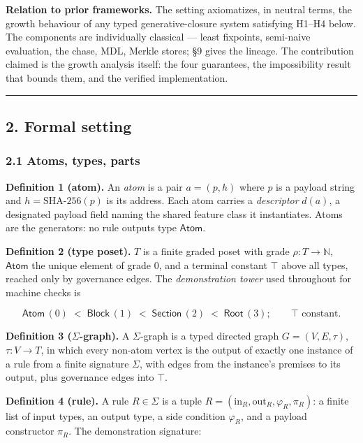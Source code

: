 \documentclass[
  10pt,
]{article}
\begin{document}
\textbf{Relation to prior frameworks.} The setting axiomatizes, in
neutral terms, the growth behaviour of any typed generative-closure
system satisfying H1--H4 below. The components are individually
classical --- least fixpoints, semi-naive evaluation, the chase, MDL,
Merkle stores; §9 gives the lineage. The contribution claimed is the
growth analysis itself: the four guarantees, the impossibility result
that bounds them, and the verified implementation.

\begin{center}\rule{0.5\linewidth}{0.5pt}\end{center}

\hypertarget{formal-setting}{%
\subsection{2. Formal setting}\label{formal-setting}}

\hypertarget{atoms-types-parts}{%
\subsubsection{2.1 Atoms, types, parts}\label{atoms-types-parts}}

\textbf{Definition 1 (atom).} An \emph{atom} is a pair \(a = (p, h)\)
where \(p\) is a payload string and \(h = \mathrm{SHA\text{-}256}(p)\)
is its address. Each atom carries a \emph{descriptor} \(d(a)\), a
designated payload field naming the shared feature class it
instantiates. Atoms are the generators: no rule outputs type
\(\mathsf{Atom}\).

\textbf{Definition 2 (type poset).} \(T\) is a finite graded poset with
grade \(\rho : T \to \mathbb{N}\), \(\mathsf{Atom}\) the unique element
of grade \(0\), and a terminal constant \(\top\) above all types,
reached only by governance edges. The \emph{demonstration tower} used
throughout for machine checks is

\[\mathsf{Atom}\,(0) \;<\; \mathsf{Block}\,(1) \;<\; \mathsf{Section}\,(2) \;<\; \mathsf{Root}\,(3); \qquad \top \text{ constant}.\]

\textbf{Definition 3 (\(\Sigma\)-graph).} A \(\Sigma\)-graph is a typed
directed graph \(G = (V, E, \tau)\), \(\tau : V \to T\), in which every
non-atom vertex is the output of exactly one instance of a rule from a
finite signature \(\Sigma\), with edges from the instance's premises to
its output, plus governance edges into \(\top\).

\textbf{Definition 4 (rule).} A rule \(R \in \Sigma\) is a tuple
\(R = (\mathrm{in}_R, \mathrm{out}_R, \varphi_R, \pi_R)\): a finite list
of input types, an output type, a side condition \(\varphi_R\), and a
payload constructor \(\pi_R\). The demonstration signature:
\end{document}
